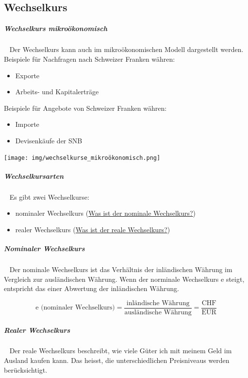 \documentclass[11pt,twoside,landscape]{article}
\begin{document}
\begin{multicols}{3}
\section{Wechselkurs}
\label{sec:org57d0c44}
\subparagraph{Wechselkurs mikroökonomisch} \
\label{sec:org44e9105}
Der Wechselkurs kann auch im mikroökonomischen Modell dargestellt werden.
Beispiele für Nachfragen nach Schweizer Franken währen:
\begin{itemize}
\item Exporte
\item Arbeits- und Kapitalerträge
\end{itemize}

Beispiele für Angebote von Schweizer Franken währen:
\begin{itemize}
\item Importe
\item Devisenkäufe der SNB
\end{itemize}


{
\begin{center}
\texttt{[image: img/wechselkurse\_mikroökonomisch.png]}
\end{center}
\label{fig:wechselkurse-als-mikroökonomisches-modell}
}

\subparagraph{Wechselkursarten} \
\label{sec:orge52f6c2}
Es gibt zwei Wechselkurse:
\begin{itemize}
\item nominaler Wechselkurs (\href{../../../roam/20220615143018-was_ist_der_nominale_wechselkurs.org}{Was ist der nominale Wechselkurs?})
\item realer Wechselkurs (\href{../../../roam/20220615150048-was_ist_der_reale_wechselkurs.org}{Was ist der reale Wechselkurs?})
\end{itemize}

\subparagraph{Nominaler Wechselkurs} \
\label{sec:org2e8f597}
Der nominale Wechselkurs ist das Verhältnis der inländischen Währung im Vergleich zur ausländischen Währung.
Wenn der norminale Wechselkurs e steigt, entspricht das einer Abwertung der inländischen Währung.

\begin{equation}
  \label{eqn:nominaler-wechselkurs}
  \text{e (nominaler Wechselkurs)} = \frac{\text{inländische Währung}}{\text{ausländische Währung}} = \frac{\text{CHF}}{\text{EUR}}
\end{equation}

\subparagraph{Realer Wechselkurs} \
\label{sec:orga8bc07c}
Der reale Wechselkurs beschreibt, wie viele Güter ich mit meinem Geld im Ausland kaufen kann.
Das heisst, die unterschiedlichen Preisniveaus werden berücksichtigt.


\end{multicols}
\end{document}
